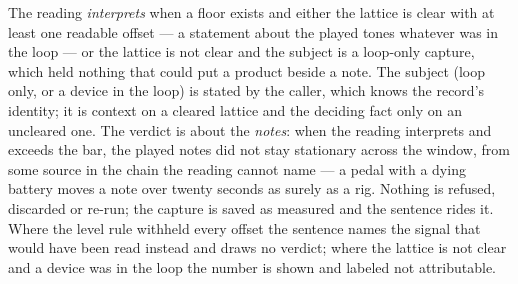 \documentclass[11pt,a4paper]{article}
\begin{document}
The reading \emph{interprets} when a floor exists and either the lattice
is clear with at least one readable offset --- a statement about the
played tones whatever was in the loop --- or the lattice is not clear and
the subject is a loop-only capture, which held nothing that could put a
product beside a note. The subject (loop only, or a device in the loop)
is stated by the caller, which knows the record's identity; it is context
on a cleared lattice and the deciding fact only on an uncleared one. The
verdict is about the \emph{notes}: when the reading interprets and exceeds
the bar, the played notes did not stay stationary across the window, from
some source in the chain the reading cannot name --- a pedal with a dying
battery moves a note over twenty seconds as surely as a rig. Nothing is
refused, discarded or re-run; the capture is saved as measured and the
sentence rides it. Where the level rule withheld every offset the sentence
names the signal that would have been read instead and draws no verdict;
where the lattice is not clear and a device was in the loop the number is
shown and labeled not attributable.
\end{document}
